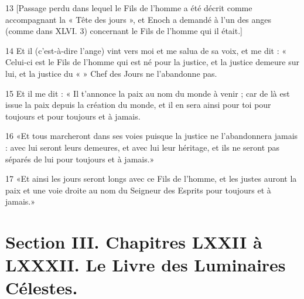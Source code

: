 \par 13 [Passage perdu dans lequel le Fils de l'homme a été décrit comme accompagnant la « Tête des jours », et Enoch a demandé à l'un des anges (comme dans XLVI. 3) concernant le Fils de l'homme qui il était.]
\par 14 Et il (c'est-à-dire l'ange) vint vers moi et me salua de sa voix, et me dit : « Celui-ci est le Fils de l'homme qui est né pour la justice, et la justice demeure sur lui, et la justice du « » Chef des Jours ne l’abandonne pas.
\par 15 Et il me dit : « Il t'annonce la paix au nom du monde à venir ; car de là est issue la paix depuis la création du monde, et il en sera ainsi pour toi pour toujours et pour toujours et à jamais.
\par 16 «Et tous marcheront dans ses voies puisque la justice ne l'abandonnera jamais : avec lui seront leurs demeures, et avec lui leur héritage, et ils ne seront pas séparés de lui pour toujours et à jamais.»
\par 17 «Et ainsi les jours seront longs avec ce Fils de l'homme, et les justes auront la paix et une voie droite au nom du Seigneur des Esprits pour toujours et à jamais.»

\part {Section III. Chapitres LXXII à LXXXII. Le Livre des Luminaires Célestes.}


